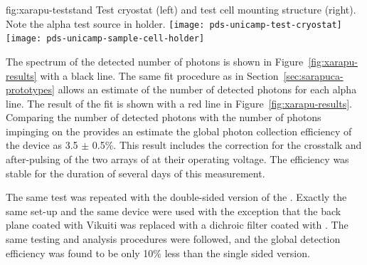 \begin{dunefigure}{fig:xarapu-teststand}
{Test cryostat (left) and  test cell mounting structure (right).  Note the alpha test source in holder.} 
	\texttt{[image: pds-unicamp-test-cryostat]} \quad
	\texttt{[image: pds-unicamp-sample-cell-holder]}
\end{dunefigure}  

The spectrum of the detected number of photons is shown in Figure~\ref{fig:xarapu-results} with a black line. The same fit procedure as in Section~\ref{sec:sarapuca-prototypes} allows an estimate of the number of detected photons for each alpha line. The result of the fit is shown with a red line in Figure~\ref{fig:xarapu-results}. Comparing the number of detected photons with the number of photons impinging on the  provides an estimate the global photon collection efficiency of the device as 3.5 $\pm$ 0.5\%.
This result includes the correction for the crosstalk and after-pulsing of the two arrays of  at their operating voltage.
The efficiency was stable for the duration of several days of this measurement.

The same test was repeated with the double-sided version of the . Exactly the same set-up and the same device were used with the exception that the back plane coated with Vikuiti was replaced with a dichroic filter coated with . The same testing and analysis procedures were followed, and the global detection efficiency was found to be only 10\% less than the single sided version.   

